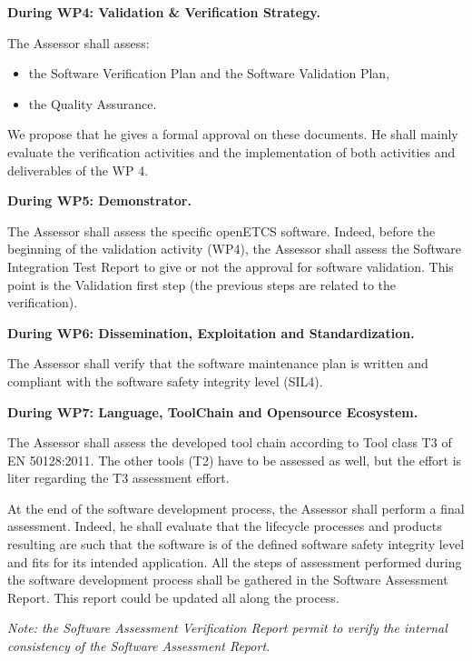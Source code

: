 \textbf{
During WP4: Validation \& Verification Strategy.
}

The Assessor shall assess:
\begin{itemize}\itemsep=0pt
  \item the Software Verification Plan and the Software Validation Plan,
  \item the Quality Assurance.
 \end{itemize}
We propose that he gives a formal approval on these documents. 
He shall mainly evaluate the verification activities and the implementation of both activities and deliverables of the WP 4.


\textbf{
During WP5: Demonstrator.
}

The Assessor shall assess the specific openETCS software.
Indeed, before the beginning of the validation activity (WP4), the Assessor shall assess the Software Integration Test Report to give or not the approval for software validation. This point is the Validation first step (the previous steps are related to the verification).


\textbf{
During WP6: Dissemination, Exploitation and Standardization.
}

The Assessor shall verify that the software maintenance plan is written and compliant with the software safety integrity level (SIL4).

\textbf{
During WP7: Language, ToolChain and Opensource Ecosystem.
}

The Assessor shall assess the developed tool chain according to Tool class T3 of EN 50128:2011. The other tools (T2) have to be assessed as well, but the effort is liter regarding the T3 assessment effort.

At the end of the software development process, the Assessor shall perform a final assessment. Indeed, he shall evaluate that the lifecycle processes and products resulting are such that the software is of the defined software safety integrity level and fits for its intended application. All the steps of assessment performed during the software development process shall be gathered in the Software Assessment Report. This report could be updated all along the process.

{\itshape
Note: the Software Assessment Verification Report permit to verify the internal consistency of the Software Assessment Report.
}


